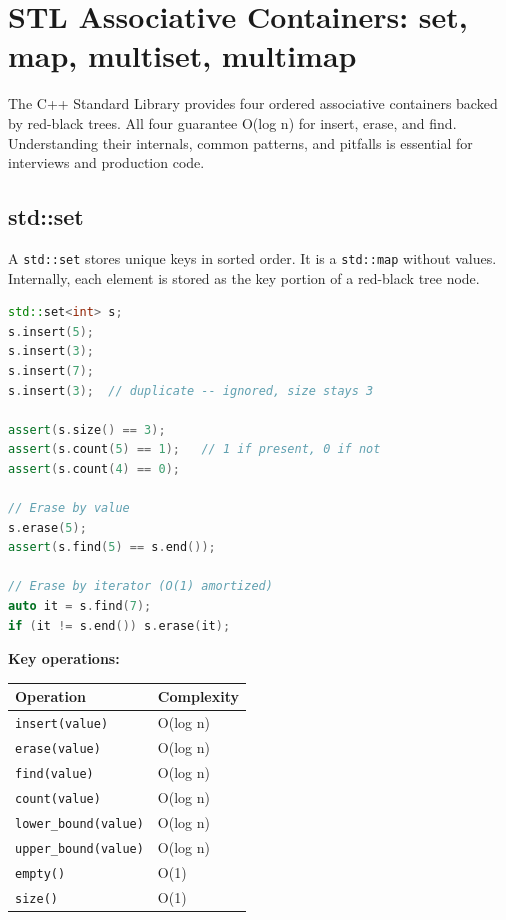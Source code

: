 \section{STL Associative Containers: set, map, multiset, multimap}

\label{sec:associative-containers}

The C++ Standard Library provides four ordered associative containers backed by red-black trees. All four guarantee O(log n) for insert, erase, and find. Understanding their internals, common patterns, and pitfalls is essential for interviews and production code.

\subsection{std::set}

A \texttt{std::set} stores unique keys in sorted order. It is a \texttt{std::map} without values. Internally, each element is stored as the key portion of a red-black tree node.

\begin{lstlisting}[language=C++]
std::set<int> s;
s.insert(5);
s.insert(3);
s.insert(7);
s.insert(3);  // duplicate -- ignored, size stays 3

assert(s.size() == 3);
assert(s.count(5) == 1);   // 1 if present, 0 if not
assert(s.count(4) == 0);

// Erase by value
s.erase(5);
assert(s.find(5) == s.end());

// Erase by iterator (O(1) amortized)
auto it = s.find(7);
if (it != s.end()) s.erase(it);
\end{lstlisting}

\textbf{Key operations:}

\begin{center}
\begin{tabular}{ll}
\toprule
Operation & Complexity \\
\midrule
\texttt{insert(value)} & O(log n) \\
\texttt{erase(value)} & O(log n) \\
\texttt{find(value)} & O(log n) \\
\texttt{count(value)} & O(log n) \\
\texttt{lower\_bound(value)} & O(log n) \\
\texttt{upper\_bound(value)} & O(log n) \\
\texttt{empty()} & O(1) \\
\texttt{size()} & O(1) \\
\bottomrule
\end{tabular}
\end{center}

